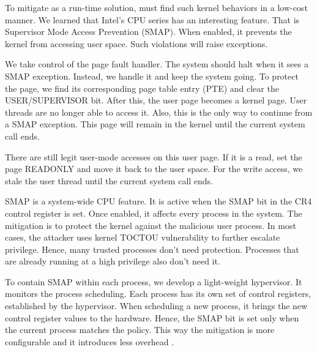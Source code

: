 To mitigate as a run-time solution, must find such kernel behaviors in a low-cost manner. We learned that Intel's CPU series has an interesting feature. That is Supervisor Mode Access Prevention (SMAP). When enabled, it prevents the kernel from accessing user space. Such violations will raise exceptions. %

We take control of the page fault handler.  The system should halt when it sees a SMAP exception.  Instead, we handle it and keep the system going. To protect the page, we find its corresponding page table entry (PTE) and clear the USER/SUPERVISOR bit. After this, the user page becomes a kernel page. User threads are no longer able to access it. Also, this is the only way to continue from a SMAP exception.  This page will remain in the kernel until the current system call ends.

There are still legit user-mode accesses on this user page. If it is a read, set the page READONLY and move it back to the user space. 
For the write access, we stale the user thread until the current system call ends.


SMAP is a system-wide CPU feature. It is active when the SMAP bit in the CR4 control register is set.  Once enabled, it affects every process in the system. The mitigation is to protect the kernel against the malicious user process. In most cases, the attacker uses kernel TOCTOU vulnerability to further escalate privilege. Hence, many trusted processes don't need protection. Processes that are already running at a high privilege also don't need it. 

To contain SMAP within each process,  we develop a light-weight hypervisor. It monitors the process scheduling. Each process has its own set of control registers, established by the hypervisor. When scheduling a new process, it brings the new control register values to the hardware. Hence, the SMAP bit is set only when the current process matches the policy. This way the mitigation is more configurable and it introduces less overhead .

